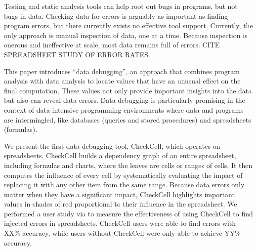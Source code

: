 Testing and static analysis tools can help root out bugs in programs,
but not bugs in data. Checking data for errors is arguably as
important as finding program errors, but there currently exists no
effective tool support. Currently, the only approach is manual
inspection of data, one at a time. Because inspection is onerous and
ineffective at scale, most data remains full of errors. CITE
SPREADSHEET STUDY OF ERROR RATES.

This paper introduces ``data debugging'', an approach that combines
program analysis with data analysis to locate values that have an
unusual effect on the final computation.  These values not only
provide important insights into the data but also can reveal data
errors.  Data debugging is particularly promising in the context of
data-intensive programming environments where data and programs are
intermingled, like databases (queries and stored procedures) and
spreadsheets (formulas).

We present the first data debugging tool, CheckCell, which operates on
spreadsheets. CheckCell builds a dependency graph of an entire
spreadsheet, including formulas and charts, where the leaves are cells
or ranges of cells. It then computes the influence of every cell by
systematically evaluating the impact of replacing it with any other
item from the same range. Because data errors only matter when they
have a significant impact, CheckCell highlights important values in
shades of red proportional to their influence in the spreadsheet.  We
performed a user study via to measure the effectiveness of using
CheckCell to find injected errors in spreadsheets. CheckCell users
were able to find errors with XX\% accuracy, while users without
CheckCell were only able to achieve YY\% accuracy.
